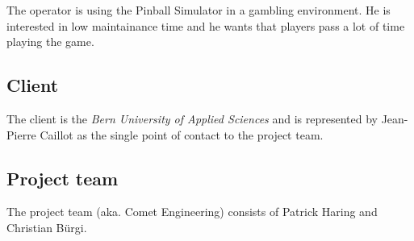 \documentclass[fontsize=12pt,
               paper=a4,
               twoside=false,
               parskip=half,
               ]{scrartcl}
\begin{document}
The operator is using the Pinball Simulator in a gambling environment. He is interested in low maintainance time and he wants that players pass a lot of time playing the game.

\subsection{Client}

The client is the \emph{Bern University of Applied Sciences} and is represented by Jean-Pierre Caillot as the single point of contact to the project team.

\subsection{Project team}

The project team (aka. Comet Engineering) consists of Patrick Haring and Christian Bürgi.
\end{document}
